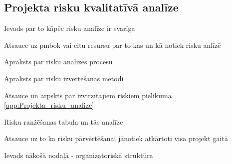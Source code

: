 \subsection{Projekta risku kvalitatīvā analīze}
Ievads par to kāpēc risku analīze ir svarīga
\par
Atsauce uz pmbok vai citu resursu par to kas un kā notiek risku anlīzē
\par
Apraksts par risku analīzes procesu
\par
Apraksts par risku izvērtēšanas metodi
\par
Atsauce un arpskts par izvirzītajiem riskiem pielikumā \ref{app:Projekta_risku_analize}
\par
Risku ranžēšanas tabula un tās analīze
\par
Atsauce uz to ka risku pārvērtēšanai jānotiek atkārtoti visa projekt gaitā
\par
Ievads nākošā nodaļā - organizatoriskā struktūra



